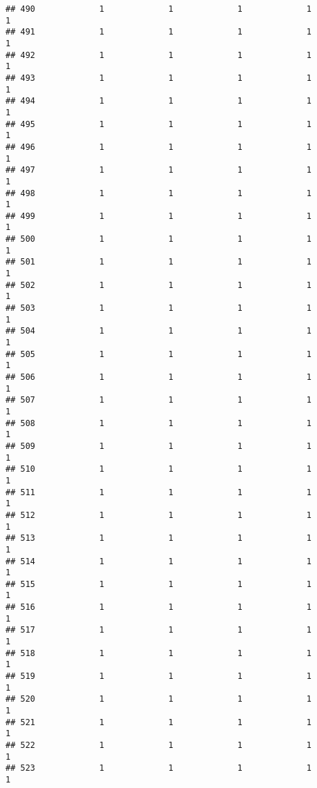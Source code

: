 \documentclass[
]{article}
\begin{document}
\begin{verbatim}
## 490             1             1             1             1             1
## 491             1             1             1             1             1
## 492             1             1             1             1             1
## 493             1             1             1             1             1
## 494             1             1             1             1             1
## 495             1             1             1             1             1
## 496             1             1             1             1             1
## 497             1             1             1             1             1
## 498             1             1             1             1             1
## 499             1             1             1             1             1
## 500             1             1             1             1             1
## 501             1             1             1             1             1
## 502             1             1             1             1             1
## 503             1             1             1             1             1
## 504             1             1             1             1             1
## 505             1             1             1             1             1
## 506             1             1             1             1             1
## 507             1             1             1             1             1
## 508             1             1             1             1             1
## 509             1             1             1             1             1
## 510             1             1             1             1             1
## 511             1             1             1             1             1
## 512             1             1             1             1             1
## 513             1             1             1             1             1
## 514             1             1             1             1             1
## 515             1             1             1             1             1
## 516             1             1             1             1             1
## 517             1             1             1             1             1
## 518             1             1             1             1             1
## 519             1             1             1             1             1
## 520             1             1             1             1             1
## 521             1             1             1             1             1
## 522             1             1             1             1             1
## 523             1             1             1             1             1

\end{verbatim}
\end{document}
